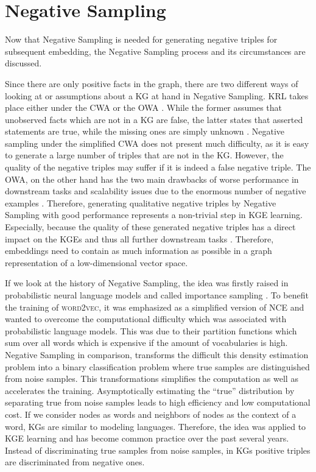 \section{Negative Sampling}
\label{sec:negative_sampling}

Now that Negative Sampling is needed for generating negative triples for subsequent embedding, the Negative Sampling process and its circumstances are discussed.

Since there are only positive facts in the graph, there are two different ways of looking at or assumptions about a \ac{KG} at hand in Negative Sampling.
\ac{KRL} takes place either under the \ac{CWA} or the \ac{OWA} \cite{qiannegative}.
While the former assumes that unobserved facts which are not in a \ac{KG} are false, the latter states that asserted statements are true, while the missing ones are simply unknown \cite{arnaout2020enriching, qiannegative}.
Negative sampling under the simplified \ac{CWA} does not present much difficulty, as it is easy to generate a large number of triples that are not in the \ac{KG}.
However, the quality of the negative triples may suffer if it is indeed a false negative triple.
The \ac{OWA}, on the other hand has the two main drawbacks of worse performance in downstream tasks and scalability issues due to the enormous number of negative examples \cite{qiannegative}.
Therefore, generating qualitative negative triples by Negative Sampling with good performance represents a non-trivial step in \ac{KGE} learning.
Especially, because the quality of these generated negative triples has a direct impact on the \acp{KGE} and thus all further downstream tasks \cite{qiannegative}.
Therefore, embeddings need to contain as much information as possible in a graph representation of a low-dimensional vector space.

If we look at the history of Negative Sampling, the idea was firstly raised in probabilistic neural language models and called importance sampling \cite{qianunderstanding}. 
To benefit the training of \textsc{word2vec}, it was emphasized as a simplified version of \ac{NCE} and wanted to overcome the computational difficulty which was associated with probabilistic language models.
This was due to their partition functions which sum over all words which is expensive if the amount of vocabularies is high.
Negative Sampling in comparison, transforms the difficult this density estimation problem into a binary classification problem where true samples are distinguished from noise samples.
This transformations simplifies the computation as well as accelerates the training.
Asymptotically estimating the “true” distribution by separating true from noise samples leads to high efficiency and low computational cost.
If we consider nodes as words and neighbors of nodes as the context of a word, \acp{KG} are similar to modeling languages.
Therefore, the idea was applied to \ac{KGE} learning and has become common practice over the past several years.
Instead of discriminating true samples from noise samples, in \acp{KG} positive triples are discriminated from negative ones.

